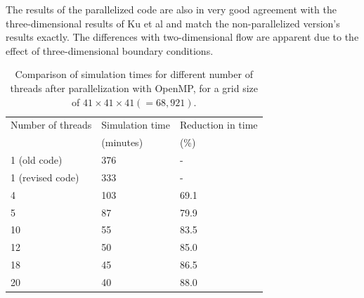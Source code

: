 \documentclass[12pt,a4paper,fleqn]{article}
\begin{document}
The results of the parallelized code are also in very good agreement with the three-dimensional results of Ku et al \cite{Ku:1987:PMS:33136.33145} and match the non-parallelized version's results exactly. The differences with two-dimensional flow are apparent due to the effect of three-dimensional boundary conditions.

\begin{table}[H]
    \centering
    \begin{tabular}{@{}lll@{}}
        \toprule
        Number of threads & Simulation time & Reduction in time \\
        & (minutes) & (\%) \\
        \midrule
        1 (old code) & 376 & - \\
        1 (revised code) & 333 & - \\
        4 & 103 & 69.1 \\
        5 & 87 & 79.9 \\
        10 & 55 & 83.5 \\
        12 & 50 & 85.0 \\
        18 & 45 & 86.5 \\
        20 & 40 & 88.0 \\
        \bottomrule
    \end{tabular}
    \caption{Comparison of simulation times for different number of threads after parallelization with OpenMP, for a grid size of \(41\times41\times41(=68,921)\).}
\end{table}




\end{document}
